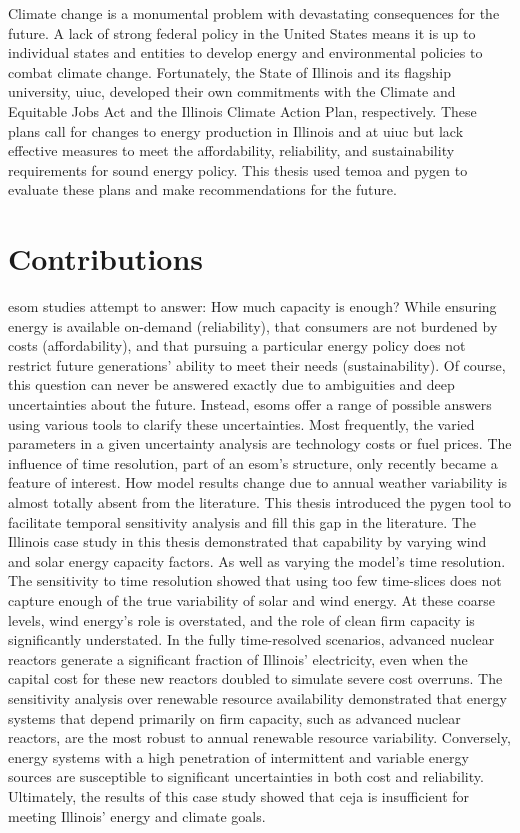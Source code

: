 Climate change is a monumental problem with devastating consequences for the future.
A lack of strong federal policy in the United States means it is up to individual
states and entities to develop energy and environmental policies to combat climate
change. Fortunately, the State of Illinois and its flagship university, \gls{uiuc},
developed their own commitments with the Climate and Equitable Jobs Act and
the Illinois Climate Action Plan, respectively. These plans call for changes
to energy production in Illinois and at \gls{uiuc} but lack effective measures
to meet the affordability, reliability, and sustainability requirements for sound
energy policy. This thesis used \gls{temoa} and \gls{pygen} to evaluate these
plans and make recommendations for the future.

\section{Contributions}

\gls{esom} studies attempt to answer: How much capacity is enough? While
ensuring energy is available on-demand (reliability), that consumers are not
burdened by costs (affordability), and that pursuing a particular energy policy
does not restrict future generations' ability to meet their needs (sustainability).
Of course, this question can never be answered exactly due to ambiguities and deep
uncertainties about the future. Instead, \glspl{esom} offer a range of possible answers
using various tools to clarify these uncertainties. Most frequently, the varied
parameters in a given uncertainty analysis are technology
costs or fuel prices. The influence of time resolution, part of an \gls{esom}'s
structure, only recently became a feature of interest. How model results change
due to annual weather variability is almost totally absent from the literature.
This thesis introduced the \gls{pygen} tool to facilitate temporal sensitivity
analysis and fill this gap in the literature. The Illinois case study in this thesis
demonstrated that capability by varying wind and solar energy capacity factors.
As well as varying the model's time resolution. The sensitivity to time resolution
showed that using too few time-slices does not capture enough of the true variability
of solar and wind energy. At these coarse levels, wind energy's role is overstated,
and the role of clean firm capacity is significantly understated. In the fully
time-resolved scenarios, advanced nuclear reactors generate a significant fraction
of Illinois' electricity, even when the capital cost for these new reactors doubled
to simulate severe cost overruns. The sensitivity analysis over renewable resource
availability demonstrated that energy systems that depend primarily on firm
capacity, such as advanced nuclear reactors, are the most robust to annual renewable
resource variability. Conversely, energy systems with a high penetration of intermittent
and variable energy sources are susceptible to significant uncertainties in both cost
and reliability. Ultimately, the results of this case study showed that \gls{ceja}
is insufficient for meeting Illinois' energy and climate goals.

